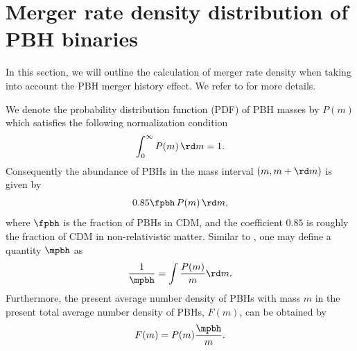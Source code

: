 \documentclass[twocolumn]{aastex631}
\def\e{\begin{equation}}
\def\q{\end{equation}}
\begin{document}
\section{\label{merger}Merger rate density distribution of PBH binaries}

In this section, we will outline the calculation of merger rate density when taking into account the PBH merger history effect. We refer to \cite{Liu:2019rnx} for more details.

We denote the probability distribution function (PDF) of PBH masses by $P(m)$
which satisfies the following normalization condition
\e\label{norm}
    \int_{0}^{\infty} P(m)\, \rd m = 1.
\q 
Consequently the abundance of PBHs in the mass interval $(m, m+\rd m)$ is given 
by \cite{Chen:2018rzo}
\e 
    0.85 \fpbh\, P(m)\, \rd m,
\q 
where $\fpbh$ is the fraction of PBHs in CDM, and the coefficient $0.85$ is roughly the fraction of CDM in non-relativistic matter.
Similar to \cite{Liu:2019rnx}, one may define a quantity $\mpbh$ as
\e\label{mpbh}
    \frac{1}{\mpbh} = \int \frac{P(m)}{m} \rd m.
\q 
Furthermore, the present average number density of PBHs with mass $m$ in the 
present total average number density of PBHs, $F(m)$, can be obtained by
\cite{Liu:2019rnx}
\e\label{Fm} 
    F(m) = P(m) \frac{\mpbh}{m}.
\q 
\end{document}
